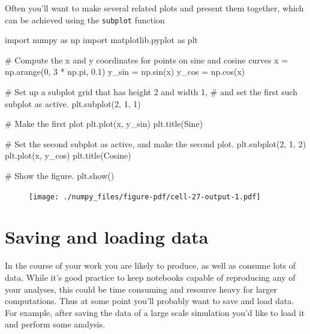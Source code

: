 \documentclass[
  letterpaper,
  DIV=11,
  numbers=noendperiod]{scrreprt}
\newenvironment{Shaded}{\begin{snugshade}}{\end{snugshade}}
\newcommand{\CommentTok}[1]{\textcolor[rgb]{0.37,0.37,0.37}{#1}}
\newcommand{\DecValTok}[1]{\textcolor[rgb]{0.68,0.00,0.00}{#1}}
\newcommand{\FloatTok}[1]{\textcolor[rgb]{0.68,0.00,0.00}{#1}}
\newcommand{\ImportTok}[1]{\textcolor[rgb]{0.00,0.46,0.62}{#1}}
\newcommand{\NormalTok}[1]{\textcolor[rgb]{0.00,0.23,0.31}{#1}}
\newcommand{\OperatorTok}[1]{\textcolor[rgb]{0.37,0.37,0.37}{#1}}
\newcommand{\StringTok}[1]{\textcolor[rgb]{0.13,0.47,0.30}{#1}}
\theoremstyle{definition}
\theoremstyle{remark}
\begin{document}
Often you'll want to make several related plots and present them
together, which can be achieved using the \texttt{subplot} function

\begin{Shaded}
\begin{Highlighting}[]
\ImportTok{import}\NormalTok{ numpy }\ImportTok{as}\NormalTok{ np}
\ImportTok{import}\NormalTok{ matplotlib.pyplot }\ImportTok{as}\NormalTok{ plt}

\CommentTok{\# Compute the x and y coordinates for points on sine and cosine curves}
\NormalTok{x }\OperatorTok{=}\NormalTok{ np.arange(}\DecValTok{0}\NormalTok{, }\DecValTok{3} \OperatorTok{*}\NormalTok{ np.pi, }\FloatTok{0.1}\NormalTok{)}
\NormalTok{y\_sin }\OperatorTok{=}\NormalTok{ np.sin(x)}
\NormalTok{y\_cos }\OperatorTok{=}\NormalTok{ np.cos(x)}

\CommentTok{\# Set up a subplot grid that has height 2 and width 1,}
\CommentTok{\# and set the first such subplot as active.}
\NormalTok{plt.subplot(}\DecValTok{2}\NormalTok{, }\DecValTok{1}\NormalTok{, }\DecValTok{1}\NormalTok{)}

\CommentTok{\# Make the first plot}
\NormalTok{plt.plot(x, y\_sin)}
\NormalTok{plt.title(}\StringTok{\textquotesingle{}Sine\textquotesingle{}}\NormalTok{)}

\CommentTok{\# Set the second subplot as active, and make the second plot.}
\NormalTok{plt.subplot(}\DecValTok{2}\NormalTok{, }\DecValTok{1}\NormalTok{, }\DecValTok{2}\NormalTok{)}
\NormalTok{plt.plot(x, y\_cos)}
\NormalTok{plt.title(}\StringTok{\textquotesingle{}Cosine\textquotesingle{}}\NormalTok{)}

\CommentTok{\# Show the figure.}
\NormalTok{plt.show()}
\end{Highlighting}
\end{Shaded}

\begin{figure}[H]

{\centering \texttt{[image: ./numpy\_files/figure-pdf/cell-27-output-1.pdf]}

}

\end{figure}

\hypertarget{saving-and-loading-data}{%
\section{Saving and loading data}\label{saving-and-loading-data}}

In the course of your work you are likely to produce, as well as consume
lots of data. While it's good practice to keep notebooks capable of
reproducing any of your analyses, this could be time consuming and
resource heavy for larger computations. Thus at some point you'll
probably want to save and load data. For example, after saving the data
of a large scale simulation you'd like to load it and perform some
analysis.
\end{document}
